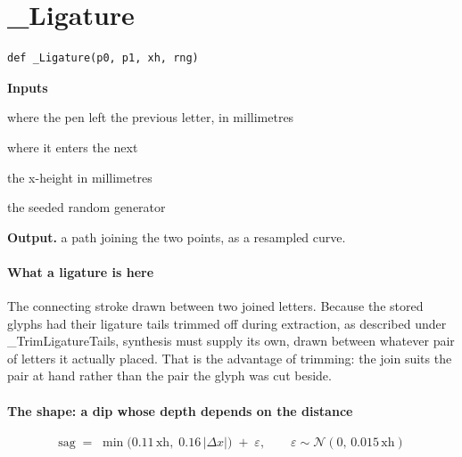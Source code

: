 \section{\_Ligature}
\begin{lstlisting}[style=sig]
def _Ligature(p0, p1, xh, rng)
\end{lstlisting}

\noindent\textbf{Inputs}
\begin{description}[leftmargin=2.2em,style=nextline,font=\normalfont\ttfamily]\setlength\itemsep{1pt}
  \item[{p0}] \normalfont where the pen left the previous letter, in millimetres
  \item[{p1}] \normalfont where it enters the next
  \item[{xh}] \normalfont the x-height in millimetres
  \item[{rng}] \normalfont the seeded random generator
\end{description}

\noindent\textbf{Output.} a path joining the two points, as a resampled curve.


\paragraph{What a ligature is here}
The connecting stroke drawn between two joined letters. Because the stored glyphs had their ligature tails trimmed off during extraction, as described under \_TrimLigatureTails, synthesis must supply its own, drawn between whatever pair of letters it actually placed. That is the advantage of trimming: the join suits the pair at hand rather than the pair the glyph was cut beside.


\paragraph{The shape: a dip whose depth depends on the distance}

\begin{equation}
\mathrm{sag} \;=\; \min\big(0.11\,\mathrm{xh},\; 0.16\,|\Delta x|\big) \;+\; \varepsilon, \qquad \varepsilon \sim \mathcal{N}(0,\, 0.015\,\mathrm{xh})
\end{equation}

